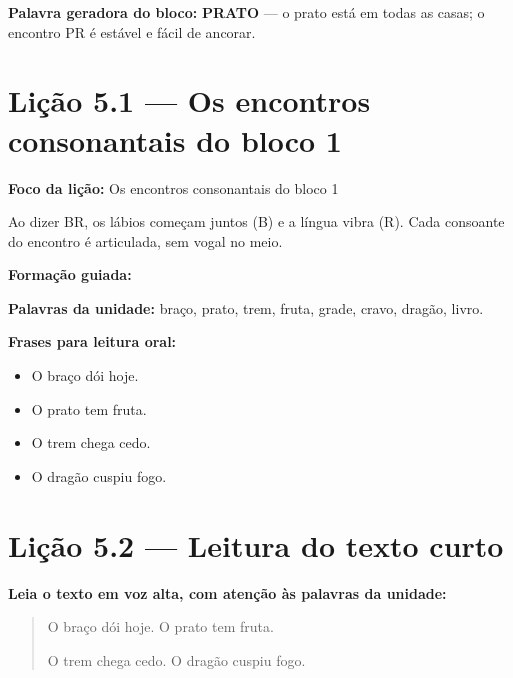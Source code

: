 \textbf{Palavra geradora do bloco:} \textbf{PRATO} --- o prato está em todas as casas; o encontro PR é estável e fácil de ancorar.

\section{Lição 5.1 --- Os encontros consonantais do bloco 1}

\textbf{Foco da lição:} Os encontros consonantais do bloco 1


\begin{boquinha}
Ao dizer BR, os lábios começam juntos (B) e a língua vibra (R). Cada consoante do encontro é articulada, sem vogal no meio.
\end{boquinha}

\noindent\textbf{Formação guiada:}

\begin{center}
\end{center}

\noindent\textbf{Palavras da unidade:} braço, prato, trem, fruta, grade, cravo, dragão, livro.

\noindent\textbf{Frases para leitura oral:}
\begin{itemize}[leftmargin=1.6em]
  \item O braço dói hoje.
  \item O prato tem fruta.
  \item O trem chega cedo.
  \item O dragão cuspiu fogo.
\end{itemize}

\section{Lição 5.2 --- Leitura do texto curto}

\noindent\textbf{Leia o texto em voz alta, com atenção às palavras da unidade:}


\begin{quote}
O braço dói hoje. O prato tem fruta.

O trem chega cedo. O dragão cuspiu fogo.
\end{quote}

